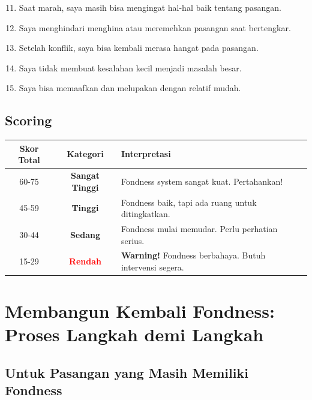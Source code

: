 \begin{exercisebox}
\begin{enumerate}
    \setcounter{enumi}{10}
    \item Saat marah, saya masih bisa mengingat hal-hal baik tentang pasangan.
    \item Saya menghindari menghina atau meremehkan pasangan saat bertengkar.
    \item Setelah konflik, saya bisa kembali merasa hangat pada pasangan.
    \item Saya tidak membuat kesalahan kecil menjadi masalah besar.
    \item Saya bisa memaafkan dan melupakan dengan relatif mudah.
\end{enumerate}

\subsection*{Scoring}

\begin{center}
\renewcommand{\arraystretch}{1.4}
\begin{tabular}{|c|c|l|}
\hline
\rowcolor{primary!20}
\textbf{Skor Total} & \textbf{Kategori} & \textbf{Interpretasi} \\
\hline
60-75 & \textcolor{sagegreen}{\textbf{Sangat Tinggi}} & Fondness system sangat kuat. Pertahankan! \\
\hline
45-59 & \textcolor{primary}{\textbf{Tinggi}} & Fondness baik, tapi ada ruang untuk ditingkatkan. \\
\hline
30-44 & \textcolor{accent}{\textbf{Sedang}} & Fondness mulai memudar. Perlu perhatian serius. \\
\hline
15-29 & \textcolor{red}{\textbf{Rendah}} & \textbf{Warning!} Fondness berbahaya. Butuh intervensi segera. \\
\hline
\end{tabular}
\end{center}
\end{exercisebox}

\section{Membangun Kembali Fondness: Proses Langkah demi Langkah}

\subsection{Untuk Pasangan yang Masih Memiliki Fondness}

